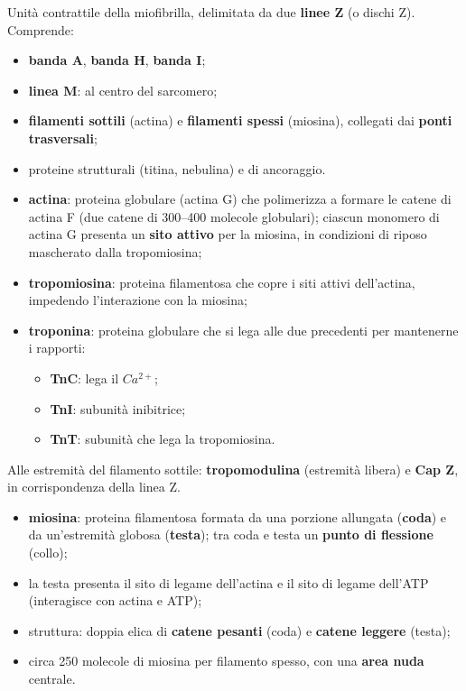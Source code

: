 Unità contrattile della miofibrilla, delimitata da due \textbf{linee Z} (o dischi Z). Comprende:
\begin{itemize}
  \item \textbf{banda A}, \textbf{banda H}, \textbf{banda I};
  \item \textbf{linea M}: al centro del sarcomero;
  \item \textbf{filamenti sottili} (actina) e \textbf{filamenti spessi} (miosina), collegati dai \textbf{ponti trasversali};
  \item proteine strutturali (titina, nebulina) e di ancoraggio.
\end{itemize}

\begin{itemize}
  \item \textbf{actina}: proteina globulare (actina G) che polimerizza a formare le catene di actina F (due catene di 300--400 molecole globulari); ciascun monomero di actina G presenta un \textbf{sito attivo} per la miosina, in condizioni di riposo mascherato dalla tropomiosina;
  \item \textbf{tropomiosina}: proteina filamentosa che copre i siti attivi dell'actina, impedendo l'interazione con la miosina;
  \item \textbf{troponina}: proteina globulare che si lega alle due precedenti per mantenerne i rapporti:
  \begin{itemize}
    \item \textbf{TnC}: lega il $Ca^{2+}$;
    \item \textbf{TnI}: subunità inibitrice;
    \item \textbf{TnT}: subunità che lega la tropomiosina.
  \end{itemize}
\end{itemize}
Alle estremità del filamento sottile: \textbf{tropomodulina} (estremità libera) e \textbf{Cap Z}, in corrispondenza della linea Z.

\begin{itemize}
  \item \textbf{miosina}: proteina filamentosa formata da una porzione allungata (\textbf{coda}) e da un'estremità globosa (\textbf{testa}); tra coda e testa un \textbf{punto di flessione} (collo);
  \item la testa presenta il sito di legame dell'actina e il sito di legame dell'ATP (interagisce con actina e ATP);
  \item struttura: doppia elica di \textbf{catene pesanti} (coda) e \textbf{catene leggere} (testa);
  \item circa 250 molecole di miosina per filamento spesso, con una \textbf{area nuda} centrale.
\end{itemize}


